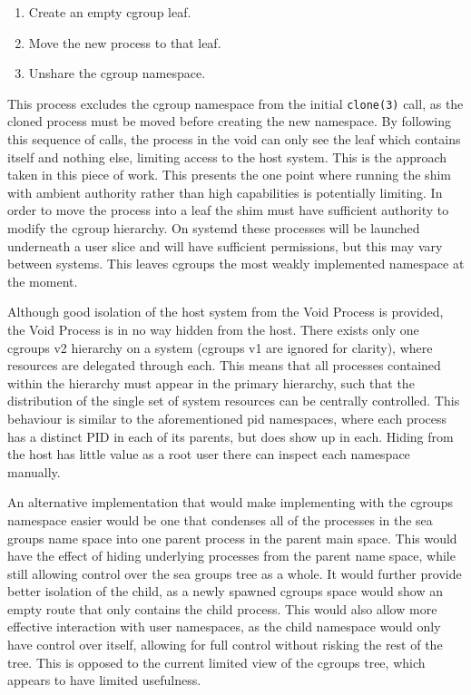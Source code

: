 \documentclass[sigplan]{acmart}
\begin{document}
\begin{enumerate}
    \item Create an empty cgroup leaf.
    \item Move the new process to that leaf.
    \item Unshare the cgroup namespace.
\end{enumerate}

This process excludes the cgroup namespace from the initial \texttt{clone(3)} call, as the cloned process must be moved before creating the new namespace. By following this sequence of calls, the process in the void can only see the leaf which contains itself and nothing else, limiting access to the host system.  This is the approach taken in this piece of work. This presents the one point where running the shim with ambient authority rather than high capabilities is potentially limiting. In order to move the process into a leaf the shim must have sufficient authority to modify the cgroup hierarchy. On systemd these processes will be launched underneath a user slice and will have sufficient permissions, but this may vary between systems. This leaves cgroups the most weakly implemented namespace at the moment.

Although good isolation of the host system from the Void Process is provided, the Void Process is in no way hidden from the host. There exists only one cgroups v2 hierarchy on a system (cgroups v1 are ignored for clarity), where resources are delegated through each. This means that all processes contained within the hierarchy must appear in the primary hierarchy, such that the distribution of the single set of system resources can be centrally controlled. This behaviour is similar to the aforementioned pid namespaces, where each process has a distinct PID in each of its parents, but does show up in each. Hiding from the host has little value as a root user there can inspect each namespace manually.

An alternative implementation that would make implementing with the cgroups namespace easier would be one that condenses all of the processes in the sea groups name space into one parent process in the parent main space. This would have the effect of hiding underlying processes from the parent name space, while still allowing control over the sea groups tree as a whole. It would further provide better isolation of the child, as a newly spawned cgroups space would show an empty route that only contains the child process. This would also allow more effective interaction with user namespaces, as the child namespace would only have control over itself, allowing for full control without risking the rest of the tree. This is opposed to the current limited view of the cgroups tree, which appears to have limited usefulness.
\end{document}
